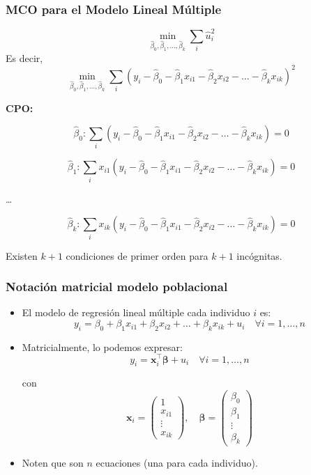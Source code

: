 \documentclass{beamer}
\begin{document}
\begin{frame}[shrink=10]
\frametitle{MCO para el Modelo Lineal Múltiple}

\[
\min_{\hat{\beta}_0, \hat{\beta}_1, \ldots, \hat{\beta}_k} \sum_i \hat{u}_i^2
\]
Es decir,
\[
\min_{\hat{\beta}_0, \hat{\beta}_1, \ldots, \hat{\beta}_k} \sum_i \left( y_i - \hat{\beta}_0 - \hat{\beta}_1x_{i1} - \hat{\beta}_2x_{i2} - \ldots - \hat{\beta}_kx_{ik} \right)^2
\]

\textbf{CPO:}

\[
\hat{\beta}_0: \sum_i \left( y_i - \hat{\beta}_0 - \hat{\beta}_1x_{i1} - \hat{\beta}_2x_{i2} - \ldots - \hat{\beta}_kx_{ik} \right) = 0
\]

\[
\hat{\beta}_1: \sum_i x_{i1} \left( y_i - \hat{\beta}_0 - \hat{\beta}_1x_{i1} - \hat{\beta}_2x_{i2} - \ldots - \hat{\beta}_kx_{ik} \right) = 0
\]

\ldots

\[
\hat{\beta}_k:
\sum_i x_{ik} \left( y_i - \hat{\beta}_0 - \hat{\beta}_1x_{i1} - \hat{\beta}_2x_{i2} - \ldots - \hat{\beta}_kx_{ik} \right) = 0
\]

Existen $k + 1$ condiciones de primer orden para $k + 1$ incógnitas.
\end{frame}
\begin{frame}
\frametitle{Notación matricial modelo poblacional}

\begin{itemize}
    \item El modelo de regresión lineal múltiple cada individuo $i$ es:
    \[ y_i = \beta_0 + \beta_1 x_{i1} + \beta_2 x_{i2} + \dots + \beta_k x_{ik} + u_i \quad \forall i = 1, \dots, n \]
    
    \item Matricialmente, lo podemos expresar:
    \[ y_i = \mathbf{x}_i^\top \mathbf{\beta} + u_i \quad \forall i = 1, \dots, n \]
    
    con
    \[ \mathbf{x}_i = \begin{pmatrix}
    1 \\
    x_{i1} \\
    \vdots \\
    x_{ik}
    \end{pmatrix}, \quad
    \mathbf{\beta} = \begin{pmatrix}
    \beta_0 \\
    \beta_1 \\
    \vdots \\
    \beta_k
    \end{pmatrix} \]
    
    \item Noten que son $n$ ecuaciones (una para cada individuo).
\end{itemize}

\end{frame}
\end{document}
